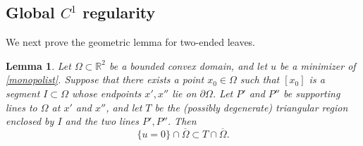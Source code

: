 \documentclass[reqno,11pt]{amsart}
\makeatletter
\newtheorem{lem}[thm]{Lemma}%
\numberwithin{equation}{section}
\theoremstyle{remark}
\makeatother
\begin{document}
\subsection{Global $C^1$ regularity}

We next prove the geometric lemma for two-ended leaves.

\begin{lem}\label{lower-bound-length}
Let $\Omega\subset\mathbb{R}^2$ be a bounded convex domain, and let $u$ be a minimizer of \eqref{monopolist}. Suppose that there exists a point $x_0\in\Omega$ such that $[x_0]$ is a segment $I\subset\Omega$ whose endpoints $x',x''$ lie on $\partial\Omega$. Let $P'$ and $P''$ be supporting lines to $\Omega$ at $x'$ and $x''$, and let $T$ be the (possibly degenerate) triangular region enclosed by $I$ and the two lines $P',P''$. Then
\[
\{u=0\}\cap\overline{\Omega}\subset T\cap\overline{\Omega}.
\]
\end{lem}
\end{document}
